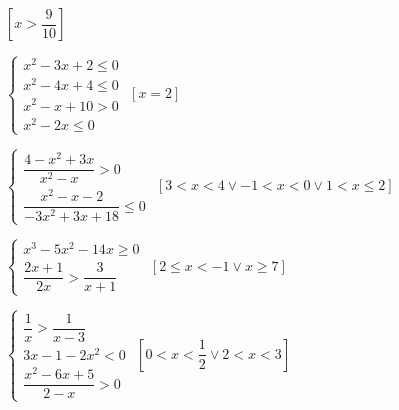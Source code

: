 \begin{esercizio}[*]
\begin{enumeratea}
 \hfill \(\left[x>\dfrac{9}{10}\right]\)
\item \(\left\{\begin{array}{l}
           x^2-3x+2\le 0\\
           x^2-4x+4\le 0\\
           x^2-x+10>0\\
           x^2-2x\le 0 \end{array}\right.\)
 \hfill \(\left[x=2\right]\)
\item \(\left\{\begin{array}{l}
           \dfrac{4-x^2+3x}{x^2-x}>0 \\
           \dfrac{x^2-x-2}{-3x^2+3x+18} \le 0 \end{array}\right.\)
 \hfill \(\left[3<x<4\vee -1<x<0\vee 1<x\le 2\right]\)
\item \(\left\{\begin{array}{l}
           x^3-5x^2-14x\ge 0 \\ 
           \dfrac{2x+1}{2x} > \dfrac 3{x+1}\end{array}\right.\)
 \hfill \(\left[2\le x<-1\vee x\ge 7\right]\)
\item \(\left\{\begin{array}{l}
           \dfrac 1 x>\dfrac 1{x-3}\\
           3x-1-2x^2<0\\
           \dfrac{x^2-6x+5}{2-x}>0 \end{array}\right.\)
 \hfill \(\left[0<x<\dfrac 1 2\vee 2<x<3\right]\)
 \end{enumeratea}
\end{esercizio}

